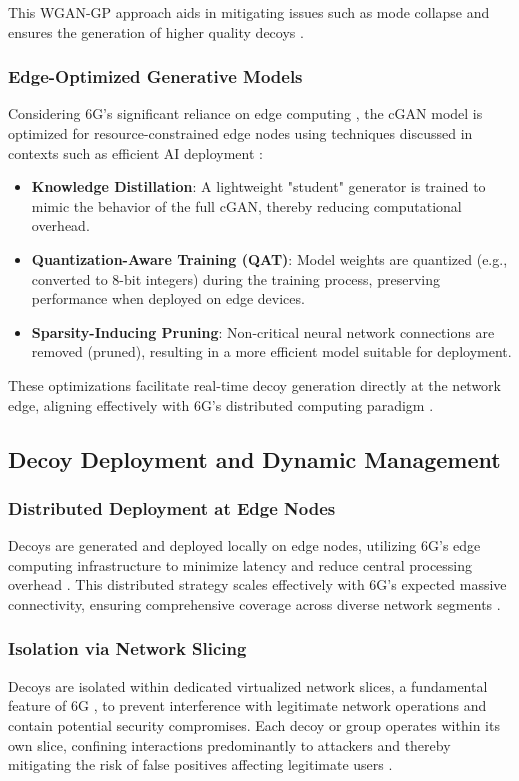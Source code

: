 \documentclass{article}
\begin{document}
This WGAN-GP approach aids in mitigating issues such as mode collapse and ensures the generation of higher quality decoys \cite{Park2023AnEAD}.

\subsubsection{Edge-Optimized Generative Models}
Considering 6G's significant reliance on edge computing \cite{Ferrag2023EdgeLFAD}, the cGAN model is optimized for resource-constrained edge nodes using techniques discussed in contexts such as efficient AI deployment \cite{Zhou2024GenerativeAAAH}:
\begin{itemize}[label=\textbf{\textbullet}]
    \item \textbf{Knowledge Distillation}: A lightweight "student" generator is trained to mimic the behavior of the full cGAN, thereby reducing computational overhead.
    \item \textbf{Quantization-Aware Training (QAT)}: Model weights are quantized (e.g., converted to 8-bit integers) during the training process, preserving performance when deployed on edge devices.
    \item \textbf{Sparsity-Inducing Pruning}: Non-critical neural network connections are removed (pruned), resulting in a more efficient model suitable for deployment.
\end{itemize}
These optimizations facilitate real-time decoy generation directly at the network edge, aligning effectively with 6G's distributed computing paradigm \cite{Gkonis2024LeveragingNDAF}.

\subsection{Decoy Deployment and Dynamic Management}
\subsubsection{Distributed Deployment at Edge Nodes}
Decoys are generated and deployed locally on edge nodes, utilizing 6G's edge computing infrastructure to minimize latency and reduce central processing overhead \cite{Ferrag2023EdgeLFAD}. This distributed strategy scales effectively with 6G's expected massive connectivity, ensuring comprehensive coverage across diverse network segments \cite{Imoize20216GESX}.

\subsubsection{Isolation via Network Slicing}
Decoys are isolated within dedicated virtualized network slices, a fundamental feature of 6G \cite{Nguyen2021SecurityAPN}, to prevent interference with legitimate network operations and contain potential security compromises. Each decoy or group operates within its own slice, confining interactions predominantly to attackers and thereby mitigating the risk of false positives affecting legitimate users \cite{Abuadbba2024From5TAM}.
\end{document}
